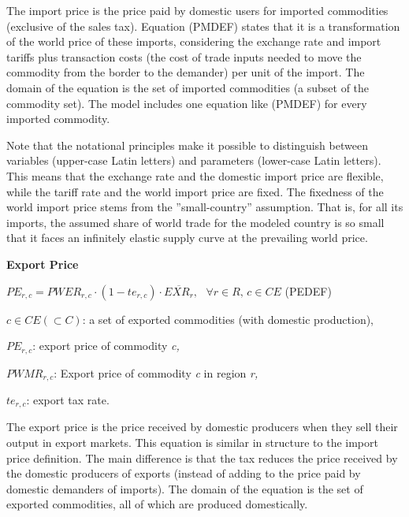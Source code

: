 \documentclass[10pt,a4paper,titlepage,dvipdfmx]{book}
\begin{document}
The import price is the price paid by domestic users for imported commodities (exclusive of the sales tax). Equation (PMDEF) states that it is a transformation of the world price of these imports, considering the exchange rate and import tariffs plus transaction costs (the cost of trade inputs needed to move the commodity from the border to the demander) per unit of the import. The domain of the equation is the set of imported commodities (a subset of the commodity set). The model includes one equation like (PMDEF) for every imported commodity.

Note that the notational principles make it possible to distinguish between variables (upper-case Latin letters) and parameters (lower-case Latin letters). This means that the exchange rate and the domestic import price are flexible, while the tariff rate and the world import price are fixed. The fixedness of the world import price stems from the ''small-country'' assumption. That is, for all its imports, the assumed share of world trade for the modeled country is so small that it faces an infinitely elastic supply curve at the prevailing world price.

\begin{flushleft}\textbf{Export Price}\end{flushleft}


\begin{center}$PE_{r,c}=PWER_{r,c}\cdot \left(1-te_{r,c}\right)\cdot \overline{EXR_{r}},\,\,\,\,\forall r\in R,\,c\in CE$ (PEDEF)
\end{center}
\begin{flushleft}
$c\in CE\left(\subset C\right)$: a set of exported commodities (with domestic production),

$PE_{r,c}$: export price of commodity \textit{c,}

$PWMR_{r,c}$: Export price of commodity \textit{c} in region \textit{r,}

$te_{r,c}$: export tax rate.
\end{flushleft}

The export price is the price received by domestic producers when they sell their output in export markets. This equation is similar in structure to the import price definition. The main difference is that the tax reduces the price received by the domestic producers of exports (instead of adding to the price paid by domestic demanders of imports). The domain of the equation is the set of exported commodities, all of which are produced domestically.
\end{document}
